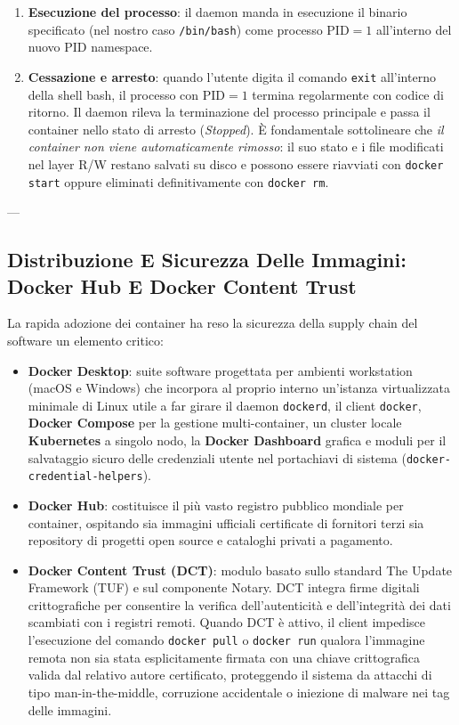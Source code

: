 \documentclass[11pt, a4paper]{article}
\begin{document}
\begin{enumerate}
\begin{itemize}
    \end{itemize}
    \item \textbf{Esecuzione del processo}: il daemon manda in esecuzione il binario specificato (nel nostro caso \texttt{/bin/bash}) come processo $\text{PID} = 1$ all'interno del nuovo PID namespace.
    \item \textbf{Cessazione e arresto}: quando l'utente digita il comando \texttt{exit} all'interno della shell bash, il processo con $\text{PID} = 1$ termina regolarmente con codice di ritorno. Il daemon rileva la terminazione del processo principale e passa il container nello stato di arresto (\emph{Stopped}). È fondamentale sottolineare che \emph{il container non viene automaticamente rimosso}: il suo stato e i file modificati nel layer R/W restano salvati su disco e possono essere riavviati con \texttt{docker start} oppure eliminati definitivamente con \texttt{docker rm}.
\end{enumerate}

---

\subsection{Distribuzione E Sicurezza Delle Immagini: Docker Hub E Docker Content Trust}

La rapida adozione dei container ha reso la sicurezza della supply chain del software un elemento critico:
\begin{itemize}
    \item \textbf{Docker Desktop}: suite software progettata per ambienti workstation (macOS e Windows) che incorpora al proprio interno un'istanza virtualizzata minimale di Linux utile a far girare il daemon \texttt{dockerd}, il client \texttt{docker}, \textbf{Docker Compose} per la gestione multi-container, un cluster locale \textbf{Kubernetes} a singolo nodo, la \textbf{Docker Dashboard} grafica e moduli per il salvataggio sicuro delle credenziali utente nel portachiavi di sistema (\texttt{docker-credential-helpers}).
    \item \textbf{Docker Hub}: costituisce il più vasto registro pubblico mondiale per container, ospitando sia immagini ufficiali certificate di fornitori terzi sia repository di progetti open source e cataloghi privati a pagamento.
    \item \textbf{Docker Content Trust (DCT)}: modulo basato sullo standard The Update Framework (TUF) e sul componente Notary. DCT integra firme digitali crittografiche per consentire la verifica dell'autenticità e dell'integrità dei dati scambiati con i registri remoti. Quando DCT è attivo, il client impedisce l'esecuzione del comando \texttt{docker pull} o \texttt{docker run} qualora l'immagine remota non sia stata esplicitamente firmata con una chiave crittografica valida dal relativo autore certificato, proteggendo il sistema da attacchi di tipo man-in-the-middle, corruzione accidentale o iniezione di malware nei tag delle immagini.
\end{itemize}
\end{document}
